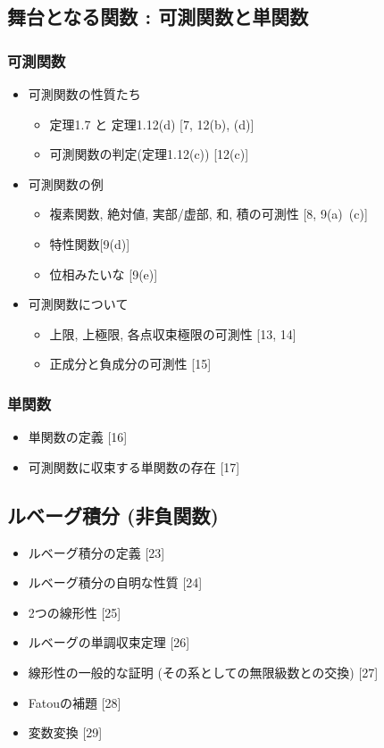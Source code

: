 \documentclass[a4paper,18pt]{jsarticle}
\begin{document}
\subsection{舞台となる関数 : 可測関数と単関数}
\subsubsection{可測関数}
\begin{itemize}
  \item 可測関数の性質たち
  \begin{itemize}
    \item 定理1.7 と 定理1.12(d) [7, 12(b), (d)]
    \item 可測関数の判定(定理1.12(c)) [12(c)]
  \end{itemize}
  \item 可測関数の例
  \begin{itemize}
    \item 複素関数, 絶対値, 実部/虚部, 和, 積の可測性 [8, 9(a)~(c)]
    \item 特性関数[9(d)]
    \item 位相みたいな [9(e)]
  \end{itemize}
  \item 可測関数について
  \begin{itemize}
    \item 上限, 上極限, 各点収束極限の可測性 [13, 14]
    \item 正成分と負成分の可測性 [15]
  \end{itemize}
\end{itemize}

\subsubsection{単関数}
\begin{itemize}
  \item 単関数の定義 [16]
  \item 可測関数に収束する単関数の存在 [17]
\end{itemize}

\subsection{ルベーグ積分 (非負関数)}
\begin{itemize}
  \item ルベーグ積分の定義 [23]
  \item ルベーグ積分の自明な性質 [24]
  \item 2つの線形性 [25]
  \item ルベーグの単調収束定理 [26]
  \item 線形性の一般的な証明 (その系としての無限級数との交換) [27]
  \item Fatouの補題 [28]
  \item 変数変換 [29]
\end{itemize}
\end{document}
